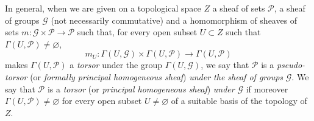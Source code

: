 \begin{env}[16.5.15]\label{IV.16.5.15}
In general, when we are given on a topological space $Z$ a sheaf of
sets $\mathscr{P}$, a sheaf of groups $\mathscr{G}$ (not necessarily
commutative) and a homomorphism of sheaves of sets
$m:\mathscr{G}\times\mathscr{P}\to\mathscr{P}$ such that, for every open subset
$U\subset Z$ such that $\Gamma(U,\mathscr{P})\neq\varnothing$,
\[
  m_U:\Gamma(U,\mathscr{G})\times\Gamma(U,\mathscr{P})
  \longrightarrow\Gamma(U,\mathscr{P})
\]
makes $\Gamma(U,\mathscr{P})$ a \emph{torsor} under the group
$\Gamma(U,\mathscr{G})$, we say that $\mathscr{P}$ is a
\emph{pseudo-torsor} (or \emph{formally principal homogeneous sheaf})
\emph{under the sheaf of groups} $\mathscr{G}$. We say that $\mathscr{P}$ is a
\emph{torsor} (or \emph{principal homogeneous sheaf}) \emph{under} $\mathscr{G}$ if
moreover $\Gamma(U,\mathscr{P})\neq\varnothing$ for every open subset
$U\neq\varnothing$ of a suitable basis of the topology of $Z$.


\end{env}
